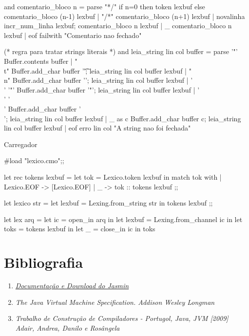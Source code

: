 \documentclass[12pt,a4paper,twoside]{report}
\begin{document}
\begin{terminal}
and comentario_bloco n = parse
    "*/"  { if n=0 then token lexbuf
           else comentario_bloco (n-1) lexbuf }
  | "/*"  { comentario_bloco (n+1) lexbuf }
  | novalinha { incr_num_linha lexbuf; comentario_bloco n lexbuf }
  | _     { comentario_bloco n lexbuf }
  | eof   { failwith "Comentario nao fechado" }

(* regra para tratar strings literais *)
and leia_string lin col buffer = parse
  '"'       { Buffer.contents buffer}
| "\\t"     { Buffer.add_char buffer '\t'; leia_string lin col buffer lexbuf }
| "\\n"     { Buffer.add_char buffer '\n'; leia_string lin col buffer lexbuf }
| '\\' '"'  { Buffer.add_char buffer '"'; leia_string lin col buffer lexbuf }
| '\\' '\\' { Buffer.add_char buffer '\\'; leia_string lin col buffer lexbuf }
| _ as c    { Buffer.add_char buffer c; leia_string lin col buffer lexbuf }
| eof       { erro lin col "A string nao foi fechada"}


\end{terminal}
Carregador
\begin{terminal}
#load "lexico.cmo";;

let rec tokens lexbuf =
  let tok = Lexico.token lexbuf in
  match tok with
  | Lexico.EOF -> [Lexico.EOF]
  | _ -> tok :: tokens lexbuf
;;

let lexico str =
  let lexbuf = Lexing.from_string str in
  tokens lexbuf
;;

let lex arq =
  let ic = open_in arq in
  let lexbuf = Lexing.from_channel ic in
  let toks = tokens lexbuf in
  let _ = close_in ic in
  toks

\end{terminal}


\clearpage
{}
\appendix
\section{Bibliografia}
	
    \begin{enumerate}
	

	\item \href {http://jasmin.sourceforge.net} {\textit   {Documentação e Download do Jasmin}}

	\item \textit {The Java Virtual Machine Specification. Addison Wesley Longman }
	
    
	\item \textit { Trabalho de Construção de Compiladores  -  Portugol, Java, JVM [2009] Adair, Andrea, Danilo e Rosângela}

	\end{enumerate}
\end{document}
